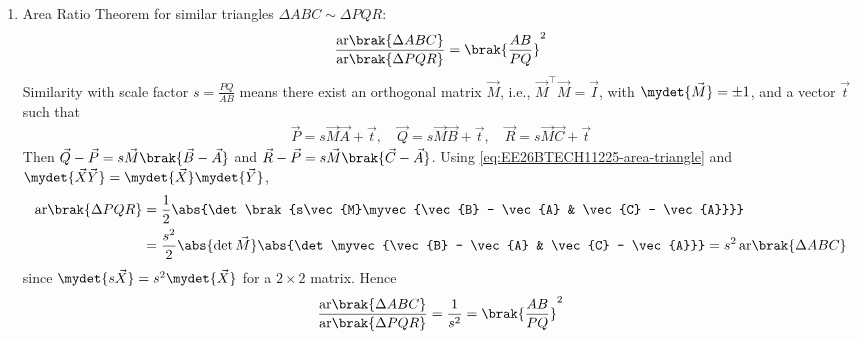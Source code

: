 \begin{enumerate}[label=\thesubsection.\arabic*, ref=\thesubsection.\theenumi]
\item Area Ratio Theorem for similar triangles $\Delta ABC \sim \Delta PQR$:
\begin{align}
	\frac{\text{ar}\brak{\Delta ABC}}{\text{ar}\brak{\Delta PQR}} = \brak{\frac{AB}{PQ}}^2
	\label{eq:EE26BTECH11225-area-ratio}
\end{align}
\solution
Similarity with scale factor $s = \frac{PQ}{AB}$ means there exist an orthogonal matrix $\vec{M}$, i.e., $\vec{M}^{\top}\vec{M} = \vec{I}$, with $\mydet{\vec{M}} = \pm 1$, and a vector $\vec{t}$ such that
\begin{align}
	\vec{P} = s\vec{M}\vec{A} + \vec{t}, \quad
	\vec{Q} = s\vec{M}\vec{B} + \vec{t}, \quad
	\vec{R} = s\vec{M}\vec{C} + \vec{t}
\end{align}
Then $\vec{Q} - \vec{P} = s\vec{M}\brak{\vec{B} - \vec{A}}$ and $\vec{R} - \vec{P} = s\vec{M}\brak{\vec{C} - \vec{A}}$. Using \eqref{eq:EE26BTECH11225-area-triangle} and $\mydet{\vec{X}\vec{Y}} = \mydet{\vec{X}}\mydet{\vec{Y}}$,
\begin{align}
	\text{ar}\brak{\Delta PQR}
	&= \frac{1}{2}\abs{\det\brak{s\vec{M}\myvec{\vec{B} - \vec{A} & \vec{C} - \vec{A}}}}
	\\
	&= \frac{s^2}{2}\abs{\det\vec{M}}\abs{\det\myvec{\vec{B} - \vec{A} & \vec{C} - \vec{A}}}
	= s^2\,\text{ar}\brak{\Delta ABC}
\end{align}
since $\mydet{s\vec{X}} = s^2\mydet{\vec{X}}$ for a $2 \times 2$ matrix. Hence
\begin{align}
	\frac{\text{ar}\brak{\Delta ABC}}{\text{ar}\brak{\Delta PQR}} = \frac{1}{s^2} = \brak{\frac{AB}{PQ}}^2
\end{align}


\end{enumerate}
